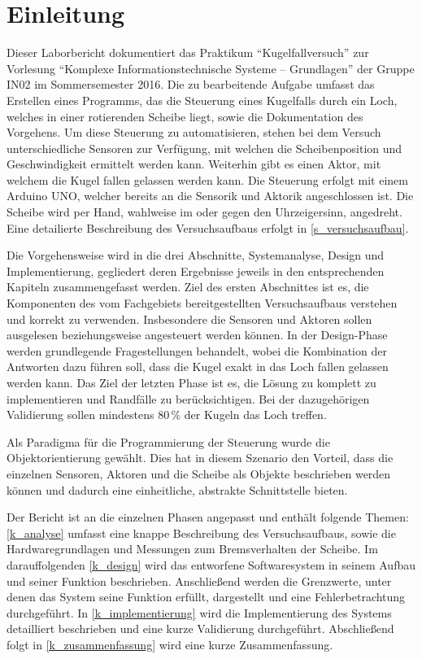 \chapter{Einleitung}
Dieser Laborbericht dokumentiert das Praktikum \enquote{Kugelfallversuch} zur Vorlesung \enquote{Komplexe Informationstechnische Systeme -- Grundlagen} der Gruppe IN02 im Sommersemester 2016.
Die zu bearbeitende Aufgabe umfasst das Erstellen eines Programms, das die Steuerung eines Kugelfalls durch ein Loch, welches in einer rotierenden Scheibe liegt, sowie die Dokumentation des Vorgehens.
Um diese Steuerung zu automatisieren, stehen bei dem Versuch unterschiedliche Sensoren zur Verfügung, mit welchen die Scheibenposition und Geschwindigkeit ermittelt werden kann.
Weiterhin gibt es einen Aktor, mit welchem die Kugel fallen gelassen werden kann.
Die Steuerung erfolgt mit einem Arduino UNO, welcher bereits an die Sensorik und Aktorik angeschlossen ist.
Die Scheibe wird per Hand, wahlweise im oder gegen den Uhrzeigersinn, angedreht.
Eine detailierte Beschreibung des Versuchsaufbaus erfolgt in \cref{s_versuchsaufbau}.

Die Vorgehensweise wird in die drei Abschnitte, Systemanalyse, Design und Implementierung, gegliedert deren Ergebnisse jeweils in den entsprechenden Kapiteln zusammengefasst werden.
Ziel des ersten Abschnittes ist es, die Komponenten des vom Fachgebiets bereitgestellten Versuchsaufbaus verstehen und korrekt zu verwenden.
Insbesondere die Sensoren und Aktoren sollen ausgelesen beziehungsweise angesteuert werden können.
In der Design-Phase werden grundlegende Fragestellungen behandelt, wobei die Kombination der Antworten dazu führen soll, dass die Kugel exakt in das Loch fallen gelassen werden kann.
Das Ziel der letzten Phase ist es, die Lösung zu komplett zu implementieren und Randfälle zu berücksichtigen.
Bei der dazugehörigen Validierung sollen mindestens 80\,\% der Kugeln das Loch treffen.


Als Paradigma für die Programmierung der Steuerung wurde die Objektorientierung gewählt.
Dies hat in diesem Szenario den Vorteil, dass die einzelnen Sensoren, Aktoren und die Scheibe als Objekte beschrieben werden können und dadurch eine einheitliche, abstrakte Schnittstelle bieten.


Der Bericht ist an die einzelnen Phasen angepasst und enthält folgende Themen:\\
\cref{k_analyse} umfasst eine knappe Beschreibung des Versuchsaufbaus, sowie die Hardwaregrundlagen und Messungen zum Bremsverhalten der Scheibe. 
Im darauffolgenden \cref{k_design} wird das entworfene Softwaresystem in seinem Aufbau und seiner Funktion beschrieben.
Anschließend werden die Grenzwerte, unter denen das System seine Funktion erfüllt, dargestellt und eine Fehlerbetrachtung durchgeführt.
In \cref{k_implementierung} wird die Implementierung des Systems detailliert beschrieben und eine kurze Validierung durchgeführt.
Abschließend folgt in \cref{k_zusammenfassung} wird eine kurze Zusammenfassung.